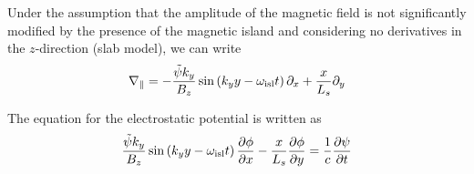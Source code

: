 Under the assumption that the amplitude of the magnetic field is not significantly modified by the presence of the magnetic island and considering no derivatives in the $z$-direction (slab model), we can write
\begin{equation}
\nabla_\parallel = - {\tilde\psi k_y\over B_z}\sin\left(k_yy-\omega_{\rm isl}t\right)\partial_x + {x \over L_s}\partial_y
\end{equation}

The equation for the electrostatic potential is written as
\begin{equation}
{\tilde\psi k_y\over B_z}\sin\left(k_yy-\omega_{\rm isl}t\right){\partial\phi\over\partial x} - {x \over L_s}{\partial\phi\over\partial y} = {1\over c}{\partial \psi\over\partial t}
\end{equation}

